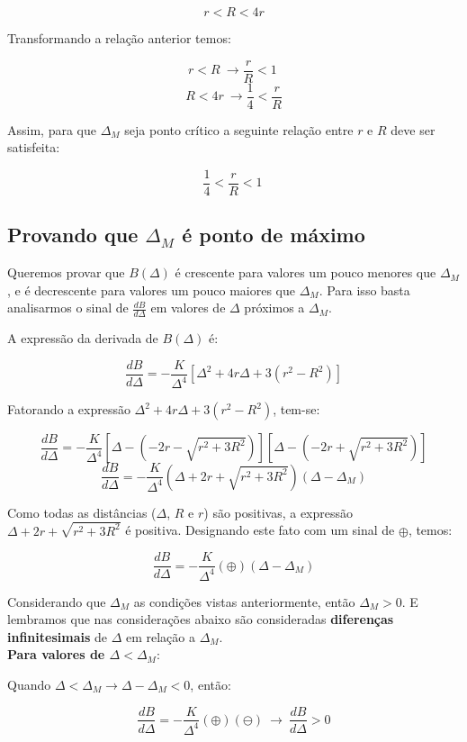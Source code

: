 \documentclass[a4paper, 12pt]{article}
\begin{document}
$$r<R<4r$$

Transformando a relação anterior temos:

$$r<R\ \longrightarrow \boxed{\frac{r}{R}<1\ }$$
$$R<4r\ \longrightarrow \boxed{\frac{1}{4}<\frac{r}{R}}$$

Assim, para que $\Delta_M$ seja ponto crítico a seguinte relação entre $r$ e $R$ deve ser satisfeita:

$$\boxed{\frac{1}{4}<\frac{r}{R}<1\ }$$

\subsection{Provando que $\Delta _M$ é ponto de máximo}

Queremos provar que $B\left(\Delta \right)$ é crescente para valores um pouco menores que $\Delta _M$, e é decrescente para valores um pouco maiores que $\Delta _M$. Para isso basta analisarmos o sinal de $\frac{dB}{d\Delta }$ em valores de $\Delta$ próximos a $\Delta _M$.

A expressão da derivada de $B\left(\Delta \right)$ é:

$$\frac{dB}{d\Delta }=-\frac{K}{\Delta ^4}\left[\Delta ^2+4r\Delta +3\left(r^2-R^2\right)\right]$$

Fatorando a expressão $\Delta ^2+4r\Delta +3\left(r^2-R^2\right)$, tem-se:

$$\frac{dB}{d\Delta }=-\frac{K}{\Delta ^4}\left[\Delta -\left(-2r-\sqrt{r^2+3R^2}\right)\right]\left[\Delta -\left(-2r+\sqrt{r^2+3R^2}\right)\right]$$
$$\frac{dB}{d\Delta }=-\frac{K}{\Delta ^4}\left(\Delta +2r+\sqrt{r^2+3R^2}\right)\left(\Delta -\Delta _M\right)$$

Como todas as distâncias ($\Delta$, $R$ e $r$) são positivas, a expressão $\Delta +2r+\sqrt{r^2+3R^2}$ é positiva. Designando este fato com um sinal de $\oplus$, temos:


$$\frac{dB}{d\Delta }=-\frac{K}{\Delta ^4}\left(\oplus\right)\left(\Delta -\Delta _M\right)$$

Considerando que $\Delta _M$ as condições vistas anteriormente, então $\Delta _M > 0$. E lembramos que nas considerações abaixo são consideradas \textbf{diferenças infinitesimais} de $\Delta$ em relação a $\Delta_M$. \\

\textbf{Para valores de $\Delta <\Delta _M$}:

Quando $\Delta <\Delta _M\longrightarrow \Delta -\Delta _M<0$, então:

$$\frac{dB}{d\Delta }=-\frac{K}{\Delta ^4}\left(\oplus \right)\left(\ominus \right)\ \longrightarrow \ \frac{dB}{d\Delta }>0$$
\end{document}
